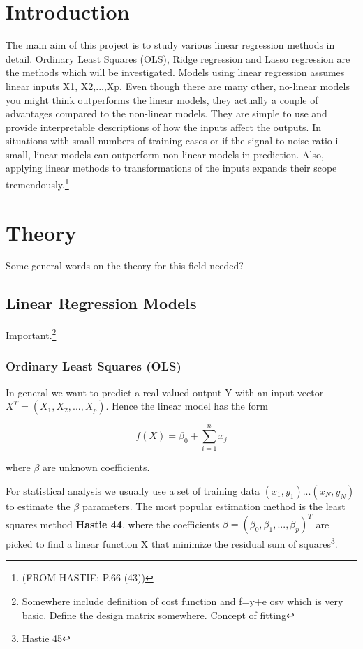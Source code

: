 \documentclass[12pt]{article}
\begin{document}
\begin{multicols}{2}


\section{Introduction}

The main aim of this project is to study various linear regression methods in detail. Ordinary Least Squares (OLS), Ridge regression and Lasso regression are the methods which will be investigated. Models using linear regression assumes linear inputs X1, X2,...,Xp. Even though there are many other, no-linear models you might think outperforms the linear models, they actually a couple of advantages compared to the non-linear models. They are simple to use and provide interpretable descriptions of how the inputs affect the outputs. In situations with small numbers of training cases or if the signal-to-noise ratio i small, linear models can outperform non-linear models in prediction. Also, applying linear methods to transformations of the inputs expands their scope tremendously.\footnote{(FROM HASTIE; P.66 (43))}

\section{Theory}

Some general words on the theory for this field needed? 

\subsection{Linear Regression Models}

Important.\footnote{Somewhere include definition of cost function and f=y+e osv which is very basic. Define the design matrix somewhere. Concept of fitting}

\subsubsection{Ordinary Least Squares (OLS)}

In general we want to predict a real-valued output Y with an input vector $X^T=(X_1,X_2,...,X_p)$. Hence the linear model has the form

$$f(X)=\beta _0 + \sum\limits_{i=1}^n x_j$$

where $\beta$ are unknown coefficients.

For statistical analysis we usually use a set of training data $(x_1,y_1)...(x_N,y_N)$ to estimate the $\beta$ parameters. The most popular estimation method is the least squares method \textbf{Hastie 44}, where the coefficients $\beta=(\beta_0,\beta_1,...,\beta_p)^T$ are picked to find a linear function X that minimize the residual sum of squares\footnote{Hastie 45}.


\end{multicols}
\end{document}
